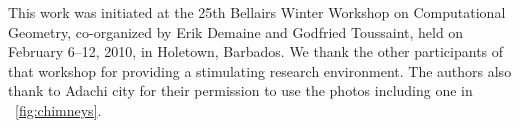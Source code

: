 \documentclass{ws-ijcga}
\begin{document}
This work was initiated at the 25th Bellairs Winter Workshop on
Computational Geometry, co-organized by Erik Demaine and Godfried Toussaint,
held on February 6--12, 2010, in Holetown, Barbados.
We thank the other participants of that workshop 
 for providing a stimulating research environment.
The authors also thank to Adachi city for their permission to use
the photos including one in \figurename~\ref{fig:chimneys}.




\end{document}
